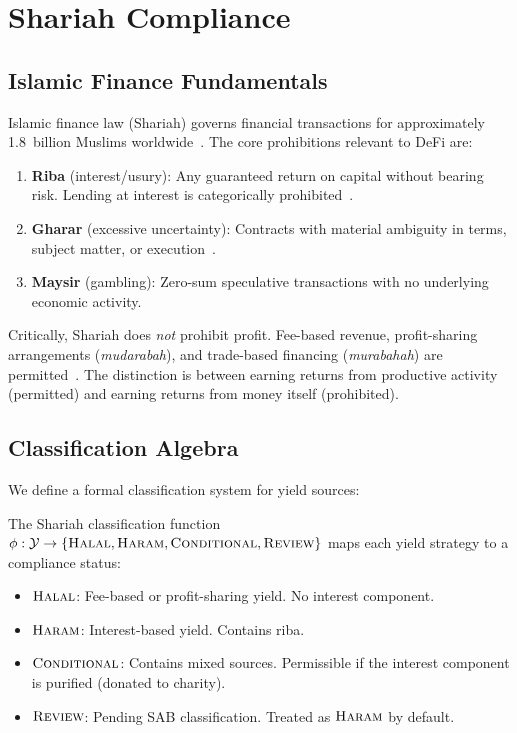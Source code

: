 \section{Shariah Compliance}

\label{sec:shariah}

\subsection{Islamic Finance Fundamentals}

Islamic finance law (Shariah) governs financial transactions for approximately 1.8~billion Muslims worldwide~\cite{usmani2002}. The core prohibitions relevant to DeFi are:

\begin{definition}
\label{def:prohibitions}
\begin{enumerate}[nosep]
  \item \textbf{Riba} (interest/usury): Any guaranteed return on capital without bearing risk. Lending at interest is categorically prohibited~\cite{iqbal2011}.
  \item \textbf{Gharar} (excessive uncertainty): Contracts with material ambiguity in terms, subject matter, or execution~\cite{elgari2003}.
  \item \textbf{Maysir} (gambling): Zero-sum speculative transactions with no underlying economic activity.
\end{enumerate}
\end{definition}

Critically, Shariah does \emph{not} prohibit profit. Fee-based revenue, profit-sharing arrangements (\emph{mudarabah}), and trade-based financing (\emph{murabahah}) are permitted~\cite{usmani2002}. The distinction is between earning returns from productive activity (permitted) and earning returns from money itself (prohibited).

\subsection{Classification Algebra}

We define a formal classification system for yield sources:

\begin{definition}
\label{def:compliance}
The Shariah classification function $\phi: \mathcal{Y} \to \{\textsc{Halal}, \textsc{Haram}, \textsc{Conditional}, \textsc{Review}\}$ maps each yield strategy to a compliance status:
\begin{itemize}[nosep]
  \item $\textsc{Halal}$: Fee-based or profit-sharing yield. No interest component.
  \item $\textsc{Haram}$: Interest-based yield. Contains riba.
  \item $\textsc{Conditional}$: Contains mixed sources. Permissible if the interest component is purified (donated to charity).
  \item $\textsc{Review}$: Pending SAB classification. Treated as $\textsc{Haram}$ by default.
\end{itemize}
\end{definition}

